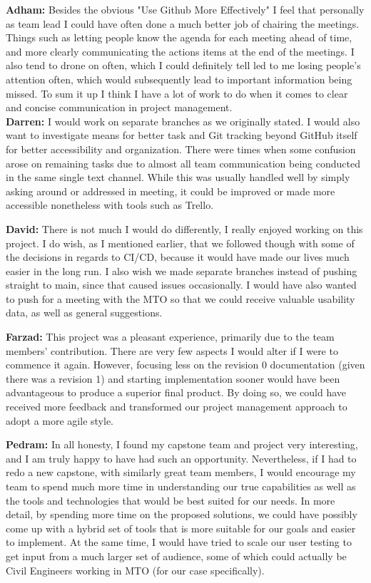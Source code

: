 \documentclass{article}
\begin{document}
\textbf{Adham:} Besides the obvious "Use Github More Effectively" I feel that personally as team lead I could have often done a much better job of chairing the meetings. Things
such as letting people know the agenda for each meeting ahead of time, and more clearly communicating the actions items at the end of the meetings. I also tend to drone on 
often, which I could definitely tell led to me losing people's attention often, which would subsequently lead to important information being missed. To sum it up I think I have
a lot of work to do when it comes to clear and concise communication in project management.\\

\textbf{Darren:} I would work on separate branches as we originally stated. I would also want to investigate means for better task and Git tracking beyond GitHub itself for better accessibility and organization. There were times when some confusion arose on remaining tasks due to almost all team communication being conducted in the same single text channel. While this was usually handled well by simply asking around or addressed in meeting, it could be improved or made more accessible nonetheless with tools such as Trello.

\textbf{David:} There is not much I would do differently, I really enjoyed working on this project. I do wish, as I mentioned earlier, that we followed though with some of the decisions in regards to CI/CD, because it would have made our lives much easier in the long run. I also wish we made separate branches instead of pushing straight to main, since that caused issues occasionally. I would have also wanted to push for a meeting with the MTO so that we could receive valuable usability data, as well as general suggestions.

\textbf{Farzad:} This project was a pleasant experience, primarily due to the team members' contribution. There are very few aspects I would alter if I were to commence it again. However, focusing less on the revision 0 documentation (given there was a revision 1) and starting implementation sooner would have been advantageous to produce a superior final product. By doing so, we could have received more feedback and transformed our project management approach to adopt a more agile style.

\textbf{Pedram:} In all honesty, I found my capstone team and project very interesting, and I am truly happy to have had such an opportunity. Nevertheless, if I had to redo a new capstone, with similarly great team members, I would encourage my team to spend much more time in understanding our true capabilities as well as the tools and technologies that would be best suited for our needs. In more detail, by spending more time on the proposed solutions, we could have possibly come up with a hybrid set of tools that is more suitable for our goals and easier to implement. At the same time, I would have tried to scale our user testing to get input from a much larger set of audience, some of which could actually be Civil Engineers working in MTO (for our case specifically). 
\end{document}
